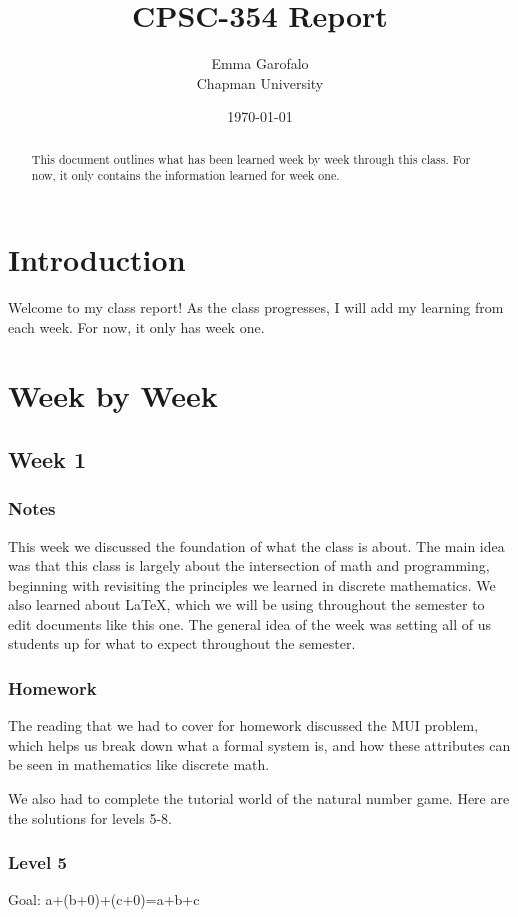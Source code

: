 \documentclass{article}
\title{CPSC-354 Report}
\author{Emma Garofalo  \\ Chapman University}
\date{\today}
\theoremstyle{theorem}
\theoremstyle{definition}
\theoremstyle{remark}
\begin{document}
\maketitle

\begin{abstract}
This document outlines what has been learned week by week through this class. For now, it only contains the information learned for week one.
\end{abstract}

\setcounter{tocdepth}{3}
\tableofcontents

\section{Introduction}\label{intro}
Welcome to my class report! As the class progresses, I will add my learning
from each week. For now, it only has week one. 
\section{Week by Week}\label{homework}

\subsection{Week 1}
\subsubsection*{Notes}
This week we discussed the foundation of what the class is about.
The main idea was that this class is largely about the intersection
of math and programming, beginning with revisiting the principles we learned
in discrete mathematics. We also learned about LaTeX, which we will be using throughout 
the semester to edit documents like this one. The general idea of the week was setting all of us 
students up for what to expect throughout the semester.
\subsubsection*{Homework}

The reading that we had to cover for homework discussed the MUI problem, which helps us
break down what a formal system is, and how these attributes can be seen in mathematics like 
discrete math.

We also had to complete the tutorial world of the natural number game. 
Here are the solutions for levels 5-8.

\subsubsection*{Level 5}
Goal: a+(b+0)+(c+0)=a+b+c
\end{document}
